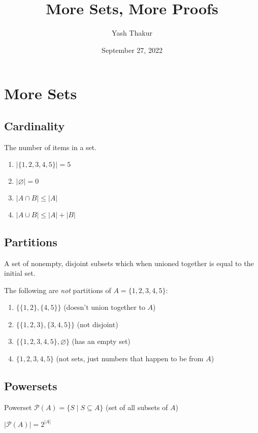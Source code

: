 \documentclass[12pt]{article}
\title{More Sets, More Proofs}
\author{Yash Thakur}
\date{September 27, 2022}
\newcommand{\set}[1]{\{#1\}}
\newcommand{\powerset}{\mathcal{P}}
\newcommand{\card}[1]{\lvert #1 \rvert}
\begin{document}
\maketitle

\section*{More Sets}

\subsection*{Cardinality}

The number of items in a set.

\begin{enumerate}
    \item $\card{\set{1, 2, 3, 4, 5}} = 5$
    \item $\card{\varnothing} = 0$
    \item $\card{A \cap B} \leq \card A$
    \item $\card{A \cup B} \leq \card A + \card B$
\end{enumerate}

\subsection*{Partitions}

A set of nonempty, disjoint subsets which when unioned together is equal to the initial set.

The following are \emph{not} partitions of $A = \set{1,2,3,4,5}$:
\begin{enumerate}
    \item $\set{\set{1,2},\set{4,5}}$ (doesn't union together to $A$)
    \item $\set{\set{1,2,3},\set{3,4,5}}$ (not disjoint)
    \item $\set{\set{1,2,3,4,5},\varnothing}$ (has an empty set)
    \item $\set{1,2,3,4,5}$ (not sets, just numbers that happen to be from $A$)
\end{enumerate}

\subsection*{Powersets}

Powerset $\powerset(A) = \set{S \mid S \subseteq A}$ (set of all subsets of $A$)

$\card{\powerset(A)} = 2^{\card A}$
\end{document}
